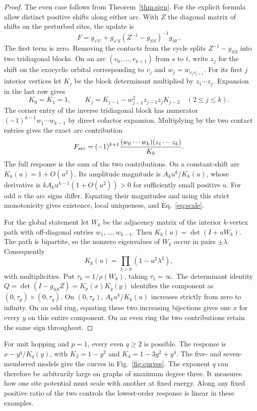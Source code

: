 \documentclass[11pt,a4paper]{article}
\begin{document}
\begin{proof}
The even case follows from Theorem~\ref{thm:sign}. For the explicit formula allow distinct positive shifts along either arc. With $Z$ the diagonal matrix of shifts on the perturbed sites, the update is
\[
 F=g_{s't'}+g_{s'S}(Z^{-1}-g_{SS})^{-1}g_{St'}.
\]
The first term is zero. Removing the contacts from the cycle splits $Z^{-1}-g_{SS}$ into two tridiagonal blocks. On an arc $(v_0,\ldots,v_{k+1})$ from $s$ to $t$, write $z_j$ for the shift on the exocyclic orbital corresponding to $v_j$ and $w_j=w_{v_j v_{j+1}}$. For its first $j$ interior vertices let $K_j$ be the block determinant multiplied by $z_1\cdots z_j$. Expansion in the last row gives
\[
 K_0=K_1=1,\qquad K_j=K_{j-1}-w_{j-1}^2 z_{j-1}z_j K_{j-2}\quad (2\le j\le k).
\]
The corner entry of the inverse tridiagonal block has numerator $(-1)^{k-1}w_1\cdots w_{k-1}$ by direct cofactor expansion. Multiplying by the two contact entries gives the exact arc contribution
\begin{equation}
 F_{\rm arc}=(-1)^{k+1}\frac{(w_0\cdots w_k)(z_1\cdots z_k)}{K_k}.
 \label{eq:arc}
\end{equation}
The full response is the sum of the two contributions. On a constant-shift arc $K_k(u)=1+O(u^2)$. Its amplitude magnitude is $A_k u^k/K_k(u)$, whose derivative is $k A_k u^{k-1}(1+O(u^2))>0$ for sufficiently small positive $u$. For odd $n$ the arc signs differ. Equating their magnitudes and using this strict monotonicity gives existence, local uniqueness, and Eq.~\eqref{eq:scale}.

For the global statement let $W_k$ be the adjacency matrix of the interior $k$-vertex path with off-diagonal entries $w_1,\ldots,w_{k-1}$. Then $K_k(u)=\det(I+uW_k)$. The path is bipartite, so the nonzero eigenvalues of $W_k$ occur in pairs $\pm\lambda$. Consequently
\[
 K_k(u)=\prod_{\lambda>0}(1-u^2\lambda^2),
\]
with multiplicities. Put $\tau_k=1/\rho(W_k)$, taking $\tau_1=\infty$. The determinant identity $Q=\det(I-g_{SS}Z)=K_p(x)K_q(y)$ identifies the component as $(0,\tau_p)\times(0,\tau_q)$. On $(0,\tau_k)$, $A_k u^k/K_k(u)$ increases strictly from zero to infinity. On an odd ring, equating these two increasing bijections gives one $x$ for every $y$ on this entire component. On an even ring the two contributions retain the same sign throughout.
\end{proof}

For unit hopping and $p=1$, every even $q\ge2$ is possible. The response is $x-y^q/K_q(y)$, with $K_2=1-y^2$ and $K_4=1-3y^2+y^4$. The five- and seven-membered models give the curves in Fig.~\ref{fig:curves}. The exponent $q$ can therefore be arbitrarily large on graphs of maximum degree three. It measures how one site potential must scale with another at fixed energy. Along any fixed positive ratio of the two controls the lowest-order response is linear in these examples.
\end{document}
